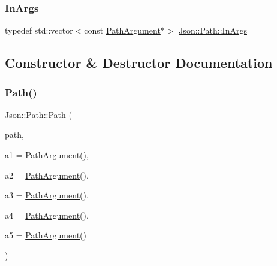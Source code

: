 \subsubsection{\texorpdfstring{In\+Args}{InArgs}}
{\footnotesize\ttfamily typedef std\+::vector$<$const \hyperlink{classJson_1_1PathArgument}{Path\+Argument}$\ast$$>$ \hyperlink{classJson_1_1Path_ab29d7b2fc896c7d3c5ed4609af3a3f23_ab29d7b2fc896c7d3c5ed4609af3a3f23}{Json\+::\+Path\+::\+In\+Args}\hspace{0.3cm}{\ttfamily [private]}}



\subsection{Constructor \& Destructor Documentation}
\mbox{\label{classJson_1_1Path_a7356c0e9c1fc2276390fd396271c1300_a7356c0e9c1fc2276390fd396271c1300}} 
\subsubsection{\texorpdfstring{Path()}{Path()}}
{\footnotesize\ttfamily Json\+::\+Path\+::\+Path (\begin{DoxyParamCaption}\item[{const \hyperlink{json_8h_a1e723f95759de062585bc4a8fd3fa4be_a1e723f95759de062585bc4a8fd3fa4be}{J\+S\+O\+N\+C\+P\+P\+\_\+\+S\+T\+R\+I\+NG} \&}]{path,  }\item[{const \hyperlink{classJson_1_1PathArgument}{Path\+Argument} \&}]{a1 = {\ttfamily \hyperlink{classJson_1_1PathArgument}{Path\+Argument}()},  }\item[{const \hyperlink{classJson_1_1PathArgument}{Path\+Argument} \&}]{a2 = {\ttfamily \hyperlink{classJson_1_1PathArgument}{Path\+Argument}()},  }\item[{const \hyperlink{classJson_1_1PathArgument}{Path\+Argument} \&}]{a3 = {\ttfamily \hyperlink{classJson_1_1PathArgument}{Path\+Argument}()},  }\item[{const \hyperlink{classJson_1_1PathArgument}{Path\+Argument} \&}]{a4 = {\ttfamily \hyperlink{classJson_1_1PathArgument}{Path\+Argument}()},  }\item[{const \hyperlink{classJson_1_1PathArgument}{Path\+Argument} \&}]{a5 = {\ttfamily \hyperlink{classJson_1_1PathArgument}{Path\+Argument}()} }\end{DoxyParamCaption})}



